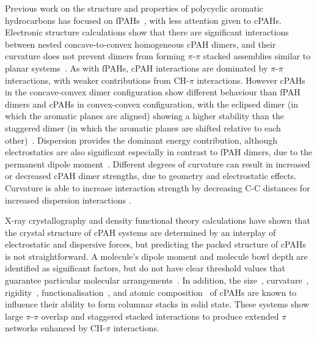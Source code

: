 Previous work on the structure and properties of polycyclic aromatic hydrocarbons has focused on fPAHs~\cite{Grancic2016,chen2014size,Rapacioli2005stacked,hernandez2017dynamics}, with less attention given to cPAHs. Electronic structure calculations show that there are significant interactions between nested concave-to-convex homogeneous cPAH dimers, and their curvature does not prevent dimers from forming $\pi$-$\pi$ stacked assemblies similar to planar systems~\cite{sygula2009pi,Cabaleiro-Lago2018}. As with fPAHs, cPAH interactions are dominated by $\pi$-$\pi$ interactions, with weaker contributions from CH-$\pi$ interactions. However cPAHs in the concave-convex dimer configuration show different behaviour than fPAH dimers and cPAHs in convex-convex configuration, with the eclipsed dimer (in which the aromatic planes are aligned) showing a higher stability than the staggered dimer (in which the aromatic planes are shifted relative to each other)~\cite{janowski2011convex,Cabaleiro-Lago2018}. Dispersion provides the dominant energy contribution, although electrostatics are also significant especially in contrast to fPAH dimers, due to the permanent dipole moment~\cite{Cabaleiro-Lago2018,janowski2011convex}.
Different degrees of curvature can result in increased or decreased cPAH dimer strengths, due to geometry and electrostatic effects. Curvature is able to increase interaction strength by decreasing C-C distances for increased dispersion interactions \cite{kennedy2012buckyplates}. 

X-ray crystallography and density functional theory calculations have shown that the crystal structure of cPAH systems are determined by an interplay of electrostatic and dispersive forces, but predicting the packed structure of cPAHs is not straightforward. A molecule's dipole moment and molecule bowl depth are identified as significant factors, but do not have clear threshold values that guarantee particular molecular arrangements~\cite{Filatov2010}. In addition, the size~\cite{wu2006aromatic,forkey1997crystallographic}, curvature~\cite{petrukhina2004hemibuckminsterfullerene,bronstein2002practical,sakurai2005structural}, rigidity~\cite{sygula1994bowl,wang2015electronic}, functionalisation~\cite{sanyal2014functional}, and atomic composition~\cite{imamura1999triphenyleno} of cPAHs are known to influence their ability to form columnar stacks in solid state. These systems show large $\pi$-$\pi$ overlap and staggered stacked interactions to produce extended $\pi$ networks enhanced by CH-$\pi$ interactions.

